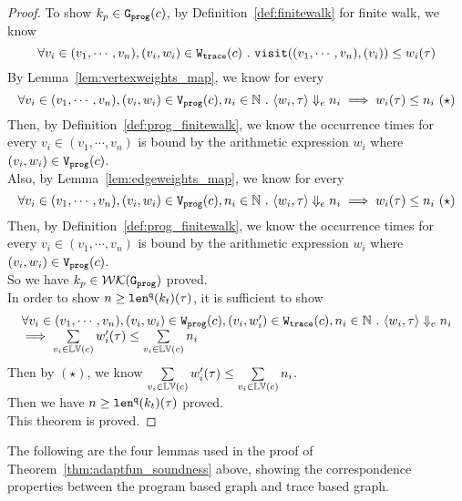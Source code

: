\begin{proof}
To show $k_p \in \mathtt{{G_{prog}}}(c)$, by Definition~\ref{def:finitewalk} for finite walk, 
we know
\[
  \forall v_i \in (v_1, \cdots, v_n), (v_i, w_i) \in \mathtt{{W_{trace}}}(c) 
  ~.~ 
  \mathtt{visit}((v_1, \cdots, v_n), (v_i)) \leq w_i(\mathtt{\tau})
\]
%
By Lemma~\ref{lem:vertexweights_map}, we know for every 
\[
  \forall v_i \in (v_1, \cdots, v_n), (v_i, w_i) \in \progV(c),
   n_i \in \mathbb{N} 
  \sthat 
  \config{w_i, \trace} \earrow n_i
  \implies
   w_i(\trace) \leq n_i ~ (\star)
\]
Then, by Definition~\ref{def:prog_finitewalk}, we know
the occurrence times for every $v_i \in (v_1, \cdots, v_n)$ 
is bound by the arithmetic expression $w_i$ where $(v_i, w_i) \in \mathtt{{V_{prog}}}(c)$.
\\
Also, by Lemma~\ref{lem:edgeweights_map}, we know for every 
\[
  \forall v_i \in (v_1, \cdots, v_n), (v_i, w_i) \in \progV(c),
   n_i \in \mathbb{N} 
  \sthat 
  \config{w_i, \trace} \earrow n_i
  \implies
   w_i(\trace) \leq n_i ~ (\star)
\]
Then, by Definition~\ref{def:prog_finitewalk}, we know
the occurrence times for every $v_i \in (v_1, \cdots, v_n)$ 
is bound by the arithmetic expression $w_i$ where $(v_i, w_i) \in \mathtt{{V_{prog}}}(c)$.
\\
So we have $k_p \in \mathcal{WK}(\mathtt{{G_{prog}}})$ proved.
\\
In order to show $ n \geq \mathtt{len}^{\tt q}(k_t)(\mathtt{\tau}) $, it is sufficient to show
\[
  \begin{array}{l}
  \forall v_i \in (v_1, \cdots, v_n),
  (v_i, w_i) \in \mathtt{{W_{prog}}}(c), (v_i, w'_i) \in \mathtt{{W_{trace}}}(c), n_i \in \mathbb{N} 
  ~.~ 
  \langle w_i, \mathtt{\tau} \rangle \Downarrow_e n_i
  \\
  \implies
   \sum\limits_{v_i \in \mathbb{LV}(c)}
   w'_i(\mathtt{\tau}) 
   \leq 
   \sum\limits_{v_i \in \mathbb{LV}(c)}n_i 
  \end{array}
  \]
Then by $(\star)$, we know $  \sum\limits_{v_i \in \mathbb{LV}(c)} w'_i(\mathtt{\tau}) 
\leq 
\sum\limits_{v_i \in \mathbb{LV}(c)}n_i $.
\\
Then we have $ n \geq \mathtt{len}^{\tt q}(k_t)(\mathtt{\tau}) $ proved.
\\
This theorem is proved.
\end{proof}
The following are the four lemmas used in the proof of Theorem~\ref{thm:adaptfun_soundness} above,
showing the correspondence properties between the program based graph and trace based graph.
